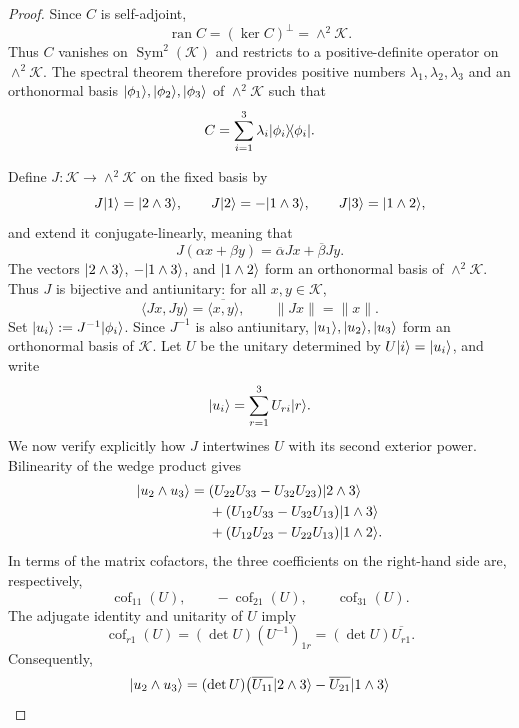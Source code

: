\documentclass[11pt]{article}
\newcommand{\ketbra}[2]{\ensuremath{\ket{#1}\!\bra{#2}}}
\DeclarePairedDelimiter\ket{\lvert}{\rangle}
\DeclarePairedDelimiter\bra{\langle}{\rvert}
\newcommand{\calK}{\mathcal{K}}
\begin{document}
\begin{proof}
    Since $C$ is self-adjoint,
    \[
        \operatorname{ran}C=(\ker C)^\perp=\wedge^2\calK.
    \]
    Thus $C$ vanishes on $\operatorname{Sym}^2(\calK)$ and restricts to a
    positive-definite operator on $\wedge^2\calK$.  The spectral theorem
    therefore provides positive numbers
    $\lambda_1,\lambda_2,\lambda_3$ and an orthonormal basis
    $\ket{\phi_1},\ket{\phi_2},\ket{\phi_3}$ of $\wedge^2\calK$ such that
    \[
        C=\sum_{i=1}^3\lambda_i\ketbra{\phi_i}{\phi_i}.
    \]

    Define $J:\calK\to\wedge^2\calK$ on the fixed basis by
    \[
        J\ket1=\ket{2\wedge3},
        \qquad
        J\ket2=-\ket{1\wedge3},
        \qquad
        J\ket3=\ket{1\wedge2},
    \]
    and extend it conjugate-linearly, meaning that
    \[
        J(\alpha x+\beta y)
        =\overline\alpha Jx+\overline\beta Jy.
    \]
    The vectors $\ket{2\wedge3}$, $-\ket{1\wedge3}$, and
    $\ket{1\wedge2}$ form an orthonormal basis of $\wedge^2\calK$.  Thus
    $J$ is bijective and antiunitary: for all $x,y\in\calK$,
    \[
        \langle Jx,Jy\rangle=\overline{\langle x,y\rangle},
        \qquad
        \|Jx\|=\|x\|.
    \]
    Set $\ket{u_i}:=J^{-1}\ket{\phi_i}$.  Since $J^{-1}$ is also
    antiunitary, $\ket{u_1},\ket{u_2},\ket{u_3}$ form an orthonormal basis
    of $\calK$.  Let $U$ be the unitary determined by
    $U\ket i=\ket{u_i}$, and write
    \[
        \ket{u_i}=\sum_{r=1}^3 U_{ri}\ket r.
    \]
    We now verify explicitly how $J$ intertwines $U$ with its second
    exterior power.  Bilinearity of the wedge product gives
    \begin{align*}
        \ket{u_2\wedge u_3}
        ={}&(U_{22}U_{33}-U_{32}U_{23})\ket{2\wedge3}\\
          &+(U_{12}U_{33}-U_{32}U_{13})\ket{1\wedge3}\\
          &+(U_{12}U_{23}-U_{22}U_{13})\ket{1\wedge2}.
    \end{align*}
    In terms of the matrix cofactors, the three coefficients on the
    right-hand side are, respectively,
    \[
        \operatorname{cof}_{11}(U),\qquad
        -\operatorname{cof}_{21}(U),\qquad
        \operatorname{cof}_{31}(U).
    \]
    The adjugate identity and unitarity of $U$ imply
    \[
        \operatorname{cof}_{r1}(U)
        =(\det U)(U^{-1})_{1r}
        =(\det U)\overline{U_{r1}}.
    \]
    Consequently,
    \[
        \ket{u_2\wedge u_3}
        =(\det U)\bigl(
            \overline{U_{11}}\ket{2\wedge3}
           -\overline{U_{21}}\ket{1\wedge3}
\]
\end{proof}
\end{document}
